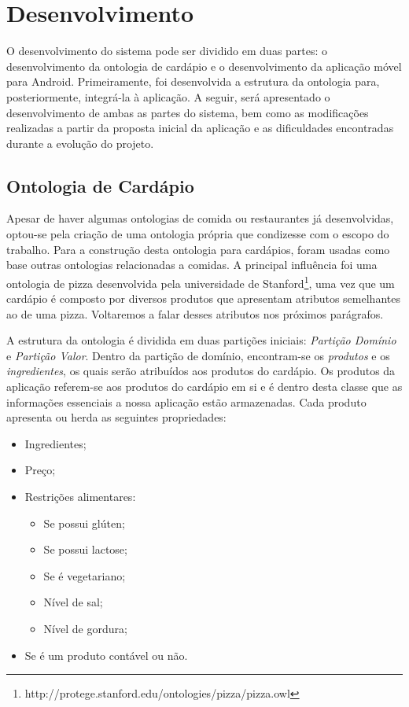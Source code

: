 
\chapter{\label{chap:desenvolvimento}Desenvolvimento}

O desenvolvimento do sistema pode ser dividido em duas partes: o desenvolvimento da ontologia de cardápio e o desenvolvimento da aplicação móvel para Android. Primeiramente, foi desenvolvida a estrutura da ontologia para, posteriormente, integrá-la à aplicação. A seguir, será apresentado o desenvolvimento de ambas as partes do sistema, bem como as modificações realizadas a partir da proposta inicial da aplicação e as dificuldades encontradas durante a evolução do projeto.

\section{Ontologia de Cardápio}

Apesar de haver algumas ontologias de comida ou restaurantes já desenvolvidas, optou-se pela criação de uma ontologia própria que condizesse com o escopo do trabalho. Para a construção desta ontologia para cardápios, foram usadas como base outras ontologias relacionadas a comidas. A principal influência foi uma ontologia de pizza desenvolvida pela universidade de Stanford\footnote{http://protege.stanford.edu/ontologies/pizza/pizza.owl}, uma vez que um cardápio é composto por diversos produtos que apresentam atributos semelhantes ao de uma pizza. Voltaremos a falar desses atributos nos próximos parágrafos.

A estrutura da ontologia é dividida em duas partições iniciais: \emph{Partição Domínio} e \emph{Partição Valor}. Dentro da partição de domínio, encontram-se os \emph{produtos} e os \emph{ingredientes}, os quais serão atribuídos aos produtos do cardápio. Os produtos da aplicação referem-se aos produtos do cardápio em si e é dentro desta classe que as informações essenciais a nossa aplicação estão armazenadas. Cada produto apresenta ou herda as seguintes propriedades:
\begin{itemize}
	\item Ingredientes;
	\item Preço;
	\item Restrições alimentares:
	\begin{itemize}
		\item Se possui glúten;
		\item Se possui lactose;
		\item Se é vegetariano;
		\item Nível de sal;
		\item Nível de gordura;
	\end{itemize}
	\item Se é um produto contável ou não.
\end{itemize}


